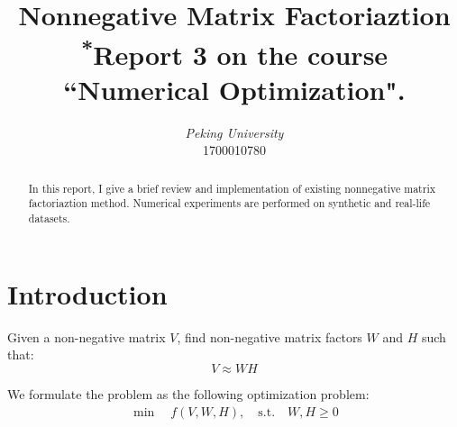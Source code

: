 \documentclass[conference,onecolumn,12pt]{IEEEtran}
\numberwithin{equation}{section}
\numberwithin{figure}{section}
\numberwithin{table}{section}
\theoremstyle{definition}
\begin{document}
\title{{Nonnegative Matrix Factoriaztion}\\
{\footnotesize \textsuperscript{*}Report 3 on the course ``Numerical Optimization".}
}

\author{
\textit{Peking University}\\
1700010780}

\maketitle


\begin{abstract}
In this report, I give a brief review and implementation of existing nonnegative matrix factoriaztion method. Numerical experiments are performed on synthetic and real-life datasets.
\end{abstract}

\thispagestyle{fancy} %
\lhead{} %
\chead{} %
\rhead{} %
\lfoot{} %
\cfoot{} %
\cfoot{\thepage} %
\renewcommand{\headrulewidth}{0pt} %
\renewcommand{\footrulewidth}{1pt} %
\pagestyle{fancy}
\cfoot{\thepage}
\tableofcontents
\clearpage
\section{Introduction}
Given a non-negative matrix
$V$, find non-negative matrix factors $W$ and $H$ such that:
\begin{equation}
  \label{nmf}
  V\approx WH
\end{equation} 
\par We formulate the problem as the following optimization problem:
\begin{equation}
	\label{nmf_opt}
  \begin{split}
    \min \quad f(V,W,H),\quad 
    \text{s.t.}\quad W,H\geq 0
  \end{split}
\end{equation}
\end{document}
